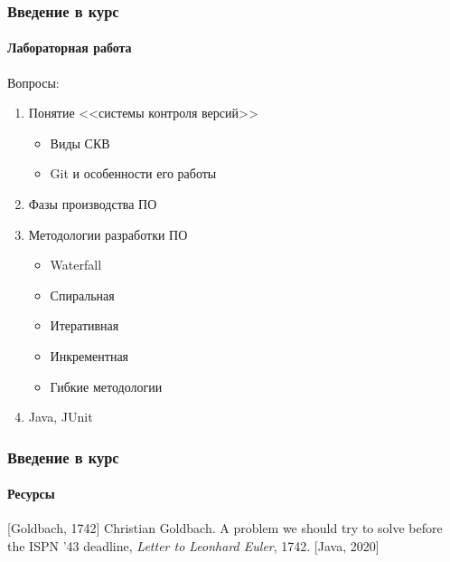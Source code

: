 \documentclass[aspectratio=169, 12pt]{beamer}
\begin{document}
\begin{frame}[t]
    \frametitle{Введение в курс}
    \framesubtitle{Лабораторная работа }
    Вопросы:
    \begin{enumerate} \pause
        \item Понятие <<системы контроля версий>>
        \begin{itemize}
            \item Виды СКВ
            \item Git и особенности его работы
        \end{itemize} \pause
        \item Фазы производства ПО \pause
        \item Методологии разработки ПО
        \begin{itemize}
            \item Waterfall
            \item Спиральная
            \item Итеративная
            \item Инкрементная
            \item Гибкие методологии
        \end{itemize} \pause
        \item Java, JUnit \pause
    \end{enumerate}
\end{frame}

\begin{frame}[t]
    \frametitle{Введение в курс}
    \framesubtitle{Ресурсы}
    \begin{thebibliography}{10}
        [Goldbach, 1742]
        Christian Goldbach.
        \newblock A problem we should try to solve before the ISPN ’43 deadline,
        \newblock \emph{Letter to Leonhard Euler}, 1742.
        [Java, 2020]
    \end{thebibliography}
\end{frame}
\end{document}
